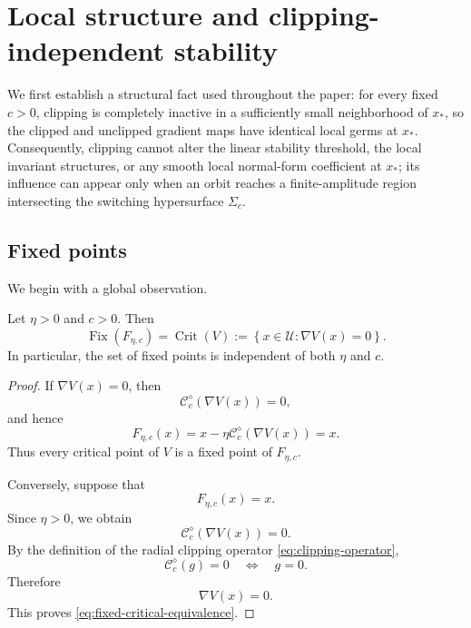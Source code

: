 
\section{Local structure and clipping-independent stability}
\label{sec:local-structure}

We first establish a structural fact used throughout the paper: for
every fixed $c>0$, clipping is completely inactive in a sufficiently
small neighborhood of $x_*$, so the clipped and unclipped gradient
maps have identical local germs at $x_*$.  Consequently, clipping
cannot alter the linear stability threshold, the local invariant
structures, or any smooth local normal-form coefficient at $x_*$;
its influence can appear only when an orbit reaches a
finite-amplitude region intersecting the switching hypersurface
$\Sigma_c$.

\subsection{Fixed points}
\label{subsec:fixed-points}

We begin with a global observation.

\begin{proposition}
\label{prop:fixed-point-invariance}
Let $\eta>0$ and $c>0$. Then
\begin{equation}
\operatorname{Fix}(F_{\eta,c})
=
\operatorname{Crit}(V)
:=
\left\{
x\in\mathcal U:
\nabla V(x)=0
\right\}.
\label{eq:fixed-critical-equivalence}
\end{equation}
In particular, the set of fixed points is independent of both
$\eta$ and $c$.
\end{proposition}

\begin{proof}
If $\nabla V(x)=0$, then
\[
\mathcal C_c^\diamond(\nabla V(x))=0,
\]
and hence
\[
F_{\eta,c}(x)
=
x-\eta\mathcal C_c^\diamond(\nabla V(x))
=
x.
\]
Thus every critical point of $V$ is a fixed point of $F_{\eta,c}$.

Conversely, suppose that
\[
F_{\eta,c}(x)=x.
\]
Since $\eta>0$, we obtain
\[
\mathcal C_c^\diamond(\nabla V(x))=0.
\]
By the definition of the radial clipping operator
\eqref{eq:clipping-operator},
\[
\mathcal C_c^\diamond(g)=0
\quad\Longleftrightarrow\quad
g=0.
\]
Therefore
\[
\nabla V(x)=0.
\]
This proves \eqref{eq:fixed-critical-equivalence}.
\end{proof}

